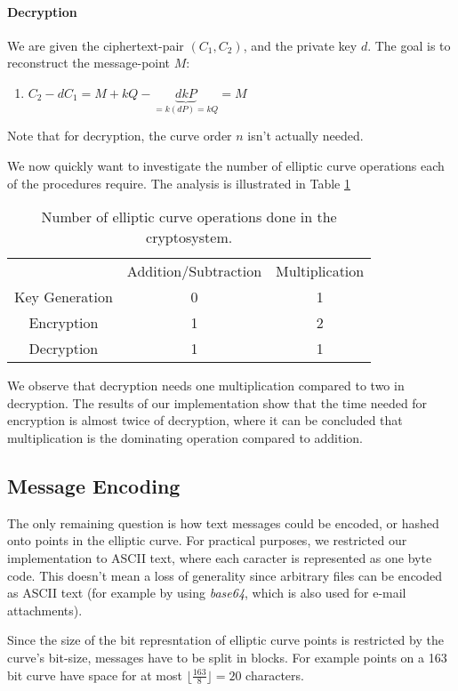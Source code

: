 \documentclass[11pt,english]{article}
\begin{document}
\paragraph{Decryption}
We are given the ciphertext-pair $(C_1,C_2)$, and the private key $d$. The goal is to reconstruct the message-point $M$:
\begin{enumerate}
\item $C_2-dC_1=M+kQ-\underbrace{dkP}_{=k(dP)=kQ}=M$
\end{enumerate}
Note that for decryption, the curve order $n$ isn't actually needed. 

We now quickly want to investigate the number of elliptic curve operations each of the procedures require. The analysis is illustrated in Table \ref{elgoperations}

\begin{table}
\centering
\begin{tabular}{c|c|c}
 & Addition/Subtraction & Multiplication \\ \cline{1-3}
Key Generation & 0 & 1 \\ 
Encryption & 1 & 2 \\ 
Decryption & 1 & 1
\end{tabular}
\caption{Number of elliptic curve operations done in the cryptosystem.}
\label{elgoperations}
\end{table}
We observe that decryption needs one multiplication compared to two in decryption. The results of our implementation show that the time needed for encryption is almost twice of decryption, where it can be concluded that multiplication is the dominating operation compared to addition.

\subsection{Message Encoding}
The only remaining question is how text messages could be encoded, or hashed onto points in the elliptic curve. For practical purposes, we restricted our implementation to ASCII text, where each caracter is represented as one byte code. This doesn't mean a loss of generality since arbitrary files can be encoded as ASCII text (for example by using \emph{base64}, which is also used for e-mail attachments).

Since the size of the bit represntation of elliptic curve points is restricted by the curve's bit-size, messages have to be split in blocks. For example points on a 163 bit curve have space for at most $\lfloor\frac{163}{8}\rfloor=20$ characters.
\end{document}
